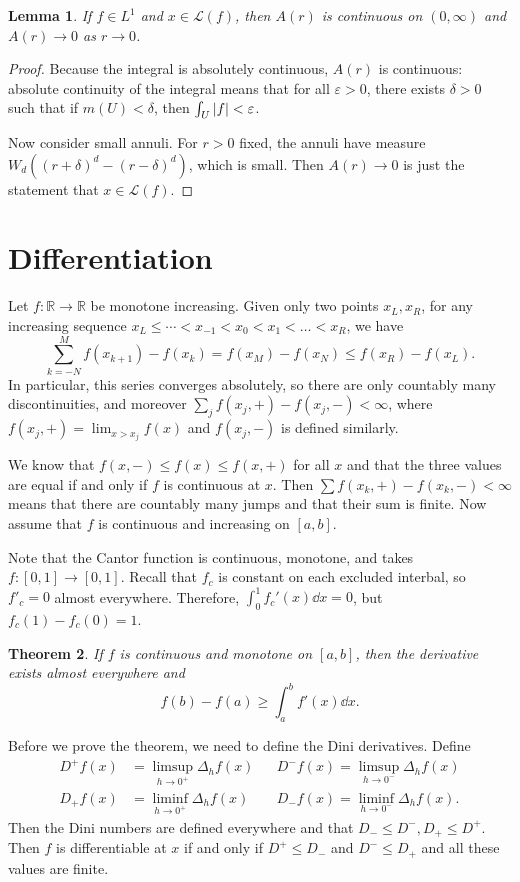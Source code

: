 \documentclass[leqno, openany]{memoir}
\newtheorem{thm}{Theorem}[chapter]
\newtheorem{lem}[thm]{Lemma}
\theoremstyle{definition}
\theoremstyle{remark}
\theoremstyle{plain}
\theoremstyle{definition}
\theoremstyle{remark}
\newcommand{\R}{\mathbb{R}}
\newcommand{\ep}{\varepsilon}
\newcommand{\mc}[1]{\mathcal{#1}}
\begin{document}
\begin{lem} If $f \in L^1$ and $x \in \mc{L}(f)$, then $A(r)$ is continuous on
$(0, \infty)$ and $A(r) \to 0$ as $r \to 0$.  \end{lem}

\begin{proof} Because the integral is absolutely continuous, $A(r)$ is
    continuous: absolute continuity of the integral means that for all $\ep >
    0$, there exists $\delta > 0$ such that if $m(U) < \delta$, then $\int_U
    \abs{f} < \ep$.

    Now consider small annuli. For $r > 0$ fixed, the annuli have measure $W_d
((r+\delta)^d - (r-\delta)^d)$, which is small. Then $A(r) \to 0$ is just the
statement that $x \in \mc{L}(f)$.  \end{proof}

\section{Differentiation}%

Let $f: \R \to \R$ be monotone increasing. Given only two points $x_L, x_R$,
for any increasing sequence $x_L \leq \cdots < x_{-1} < x_0 < x_1 < \ldots <
x_R$, we have \[ \sum_{k=-N}^M f(x_{k+1}) - f(x_k) = f(x_M) - f(x_N) \leq
f(x_R) - f(x_L). \] In particular, this series converges absolutely, so there
are only countably many discontinuities, and moreover $\sum_j f(x_j,+) -
f(x_j,-) < \infty$, where $f(x_j,+) = \lim_{x>x_j}f(x)$ and $f(x_j,-)$ is
defined similarly.

We know that $f(x,-) \leq f(x) \leq f(x,+)$ for all $x$ and that the three
values are equal if and only if $f$ is continuous at $x$. Then $\sum f(x_k,+) -
f(x_k,-) < \infty$ means that there are countably many jumps and that their sum
is finite. Now assume that $f$ is continuous and increasing on $[a,b]$. 

Note that the Cantor function is continuous, monotone, and takes $f: [0,1] \to
[0,1]$. Recall that $f_c$ is constant on each excluded interbal, so $f'_c = 0$
almost everywhere. Therefore, $\int_0^1 f_c'(x) \dd{x} = 0$, but $f_c(1) -
f_c(0) = 1$.

\begin{thm} If $f$ is continuous and monotone on $[a,b]$, then the derivative
    exists almost everywhere and \[ f(b) - f(a) \geq \int_a^b f'(x) \dd{x}. \]
\end{thm}

Before we prove the theorem, we need to define the Dini derivatives. Define
\begin{align*} D^+ f(x) &= \limsup_{h \to 0^+} \Delta_h f(x) & & D^- f(x) =
    \limsup_{h \to 0^-} \Delta_h f(x) \\ D_+ f(x) &= \liminf_{h \to 0^+}
    \Delta_h f(x) & & D_- f(x) = \liminf_{h \to 0^-} \Delta_h f(x).
\end{align*} Then the Dini numbers are defined everywhere and that $D_- \leq
D^-, D_+ \leq D^+$. Then $f$ is differentiable at $x$ if and only if $D^+ \leq
D_-$ and $D^- \leq D_+$ and all these values are finite.
\end{document}
